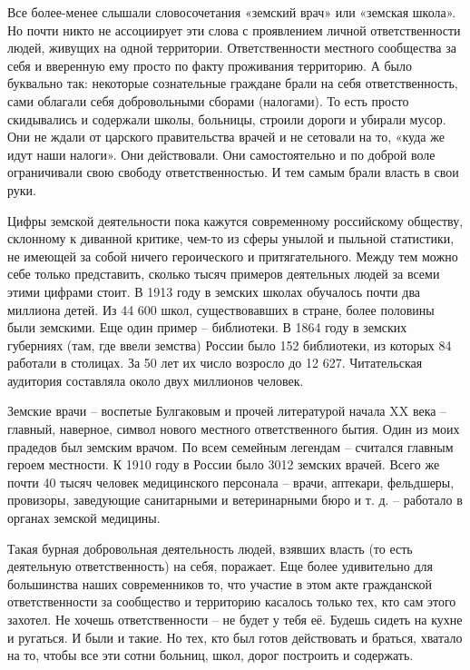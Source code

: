 Все более-менее слышали словосочетания «земский врач» или «земская школа». Но
почти никто не ассоциирует эти слова с проявлением личной ответственности
людей, живущих на одной территории. Ответственности местного сообщества за себя
и вверенную ему просто по факту проживания территорию. А было буквально так:
некоторые сознательные граждане брали на себя ответственность, сами облагали
себя добровольными сборами (налогами). То есть просто скидывались и содержали
школы, больницы, строили дороги и убирали мусор. Они не ждали от царского
правительства врачей и не сетовали на то, «куда же идут наши налоги». Они
действовали. Они самостоятельно и по доброй воле ограничивали свою свободу
ответственностью. И тем самым брали власть в свои руки.

Цифры земской деятельности пока кажутся современному российскому обществу,
склонному к диванной критике, чем-то из сферы унылой и пыльной статистики, не
имеющей за собой ничего героического и притягательного. Между тем можно себе
только представить, сколько тысяч примеров деятельных людей за всеми этими
цифрами стоит. В 1913 году в земских школах обучалось почти два миллиона детей.
Из 44 600 школ, существовавших в стране, более половины были земскими. Еще один
пример – библиотеки. В 1864 году в земских губерниях (там, где ввели земства)
России было 152 библиотеки, из которых 84 работали в столицах. За 50 лет их
число возросло до 12 627. Читательская аудитория составляла около двух
миллионов человек.

Земские врачи – воспетые Булгаковым и прочей литературой начала XX века –
главный, наверное, символ нового местного ответственного бытия. Один из моих
прадедов был земским врачом. По всем семейным легендам – считался главным
героем местности. К 1910 году в России было 3012 земских врачей. Всего же почти
40 тысяч человек медицинского персонала – врачи, аптекари, фельдшеры,
провизоры, заведующие санитарными и ветеринарными бюро и т. д. – работало в
органах земской медицины.

Такая бурная добровольная деятельность людей, взявших власть (то есть
деятельную ответственность) на себя, поражает. Еще более удивительно для
большинства наших современников то, что участие в этом акте гражданской
ответственности за сообщество и территорию касалось только тех, кто сам этого
захотел. Не хочешь ответственности – не будет у тебя её. Будешь сидеть на кухне
и ругаться. И были и такие. Но тех, кто был готов действовать и браться,
хватало на то, чтобы все эти сотни больниц, школ, дорог построить и содержать. 

